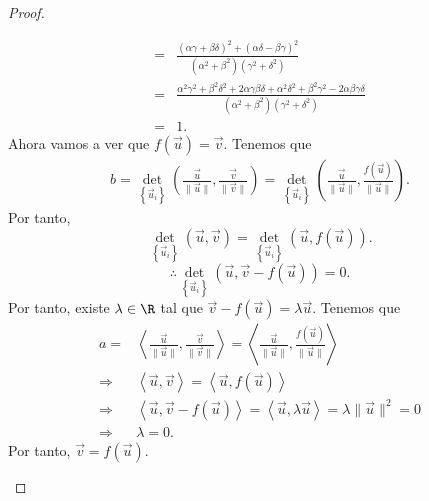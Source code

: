 \begin{proof}
\begin{description}
\[\begin{split}
	= & \frac{\left(\alpha \gamma + \beta \delta \right)^{2} + \left(\alpha \delta - \beta \gamma \right)^{2}}{\left(\alpha^{2} + \beta^{2}\right)\left(\gamma^{2} + \delta^{2}\right)} \\
	= & \frac{\alpha^{2}\gamma^{2} + \beta^{2}\delta^{2} + 2\alpha\gamma\beta\delta + \alpha^{2}\delta^{2} + \beta^{2}\gamma^{2}-2\alpha\beta\gamma\delta }{\left(\alpha^{2}+\beta^{2}\right)\left(\gamma^{2}+\delta^{2}\right)}\\
	= & 1.
\end{split}
\]
Ahora vamos a ver que $\displaystyle f\left(\vec{u}\right) = \vec{v} $. Tenemos que
\[
\begin{split}
	b =  \det_{ \left\{ \vec{u}_{i}\right\} }\left(\frac{\vec{u}}{\|\vec{u}\|}, \frac{\vec{v}}{\|\vec{v}\|}\right) 
	=  \det_{ \left\{ \vec{u}_{i}\right\} }\left(\frac{\vec{u}}{\|\vec{u}\|}, \frac{f\left(\vec{u}\right)}{\|\vec{u}\|}\right) .
\end{split}
\]
Por tanto, 
\[\det_{ \left\{ \vec{u}_{i}\right\} }\left( \vec{u}, \vec{v}\right) = \det_{ \left\{ \vec{u}_{i}\right\} }\left(\vec{u}, f\left(\vec{u}\right)\right) .\]
\[\therefore \det_{ \left\{ \vec{u}_{i}\right\} }\left(\vec{u}, \vec{v}-f\left(\vec{u}\right)\right) = 0 .\]
Por tanto, existe $\displaystyle \lambda \in \R $ tal que $\displaystyle \vec{v}-f\left(\vec{u}\right) = \lambda \vec{u} $. Tenemos que
\[
\begin{split}
	a = & \left\langle \frac{\vec{u}}{\|\vec{u}\|}, \frac{\vec{v}}{\|\vec{v}\|} \right\rangle = \left\langle \frac{\vec{u}}{\|\vec{u}\|}, \frac{f\left(\vec{u}\right)}{\|\vec{u}\|} \right\rangle \\
\Rightarrow & \left\langle \vec{u}, \vec{v} \right\rangle  = \left\langle \vec{u}, f\left(\vec{u}\right) \right\rangle \\
\Rightarrow &  \left\langle \vec{u}, \vec{v}-f\left(\vec{u}\right) \right\rangle  = \left\langle \vec{u}, \lambda\vec{u} \right\rangle  = \lambda \|\vec{u}\|^{2} = 0 \\
\Rightarrow & \lambda = 0.
\end{split}
\]
Por tanto, $\displaystyle \vec{v} = f\left(\vec{u}\right) $.
\end{description}
\end{proof}
